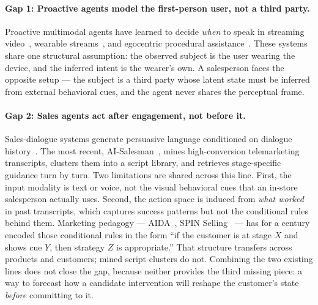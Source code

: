 \documentclass{article}
\begin{document}
\paragraph{Gap 1: Proactive agents model the first-person user, not a third party.}
Proactive multimodal agents have learned to decide \emph{when} to speak in streaming video~\cite{MMDuet,MMDuet2,StreamBridge,Dispider,ViSpeak,ProactiveVideoQA}, wearable streams~\cite{ContextAgent,SocialMind}, and egocentric procedural assistance~\cite{ProAssist}. These systems share one structural assumption: the observed subject is the user wearing the device, and the inferred intent is the wearer's own. A salesperson faces the opposite setup --- the subject is a third party whose latent state must be inferred from external behavioral cues, and the agent never shares the perceptual frame.

\paragraph{Gap 2: Sales agents act after engagement, not before it.}
Sales-dialogue systems generate persuasive language conditioned on dialogue history~\cite{PersuasionForGood,Hiraoka2016,SalesBot,SalesBot2,SalesAgent,CSales,AffectMind,SalesRLAgent,AISalesman}. The most recent, AI-Salesman~\cite{AISalesman}, mines high-conversion telemarketing transcripts, clusters them into a script library, and retrieves stage-specific guidance turn by turn. Two limitations are shared across this line. First, the input modality is text or voice, not the visual behavioral cues that an in-store salesperson actually uses. Second, the action space is induced from \emph{what worked} in past transcripts, which captures success patterns but not the conditional rules behind them. Marketing pedagogy --- AIDA~\cite{Lewis1898,StrongHughes}, SPIN Selling~\cite{Rackham} --- has for a century encoded those conditional rules in the form ``if the customer is at stage $X$ and shows cue $Y$, then strategy $Z$ is appropriate.'' That structure transfers across products and customers; mined script clusters do not. Combining the two existing lines does not close the gap, because neither provides the third missing piece: a way to forecast how a candidate intervention will reshape the customer's state \emph{before} committing to it.
\end{document}
